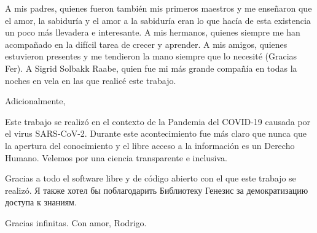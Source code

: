 \label{chapter:agradecimientos}

{\color{gray}

  
}

{
\color{gray}
\setlength{\parskip}{40pt} 
A mis padres, quienes fueron también mis primeros maestros y me enseñaron que el amor, la sabiduría y el amor a la sabiduría eran lo que hacía de esta existencia un poco más llevadera e interesante. A mis hermanos, quienes siempre me han acompañado en la difícil tarea de crecer y aprender. A mis amigos, quienes estuvieron presentes y me tendieron la mano siempre que lo necesité (Gracias Fer). A Sigrid Solbakk Raabe, quien fue mi más grande compañía en todas la noches en vela en las que realicé este trabajo.
}


{ 
\color{gray}
Adicionalmente,

Este trabajo se realizó en el contexto de la Pandemia del COVID-19 causada por el virus SARS-CoV-2. Durante este acontecimiento fue más claro que nunca que la apertura del conocimiento y el libre acceso a la información es un Derecho Humano. Velemos por una ciencia transparente e inclusiva.

Gracias a todo el software libre y de código abierto con el que este trabajo se realizó. \textrussian{Я также хотел бы поблагодарить Библиотеку Генезис за демократизацию доступа к знаниям. }
}

{
\color{gray}
\setlength{\parskip}{20pt} 
Gracias infinitas. Con amor, 
Rodrigo.
}
